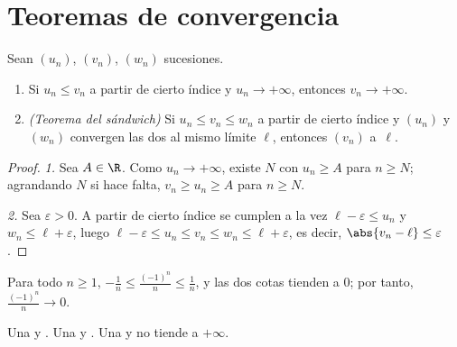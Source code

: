 \section{Teoremas de convergencia}

\begin{theorem}\label{thm:g12:seq:squeeze}
Sean $(u_n)$, $(v_n)$, $(w_n)$ sucesiones.
\begin{enumerate}
  \item Si $u_n \leq v_n$ a partir de cierto índice y $u_n \to +\infty$,
        entonces $v_n \to +\infty$.
  \item \emph{(Teorema del sándwich)} Si
        $u_n \leq v_n \leq w_n$ a partir de cierto índice y $(u_n)$ y
        $(w_n)$ convergen las dos al mismo límite $\ell$, entonces $(v_n)$
         a~$\ell$.
\end{enumerate}
\end{theorem}

\begin{proof}
\emph{1.} Sea $A \in \R$. Como $u_n \to +\infty$, existe $N$ con
$u_n \geq A$ para $n \geq N$; agrandando $N$ si hace falta,
$v_n \geq u_n \geq A$ para $n \geq N$.

\emph{2.} Sea $\varepsilon > 0$. A partir de cierto índice se cumplen a la
vez $\ell - \varepsilon \leq u_n$ y $w_n \leq \ell + \varepsilon$, luego
$\ell - \varepsilon \leq u_n \leq v_n \leq w_n \leq \ell + \varepsilon$, es
decir, $\abs{v_n - \ell} \leq \varepsilon$.
\end{proof}

\begin{example}
Para todo $n \geq 1$,
$-\frac{1}{n} \leq \frac{(-1)^n}{n} \leq \frac{1}{n}$, y las dos cotas
tienden a $0$; por tanto, $\frac{(-1)^n}{n} \to 0$.
\end{example}

\begin{theorem}\label{thm:g12:seq:monotone}
Una   y  . Una 
 y  . Una   y no
 tiende a $+\infty$.
\end{theorem}

